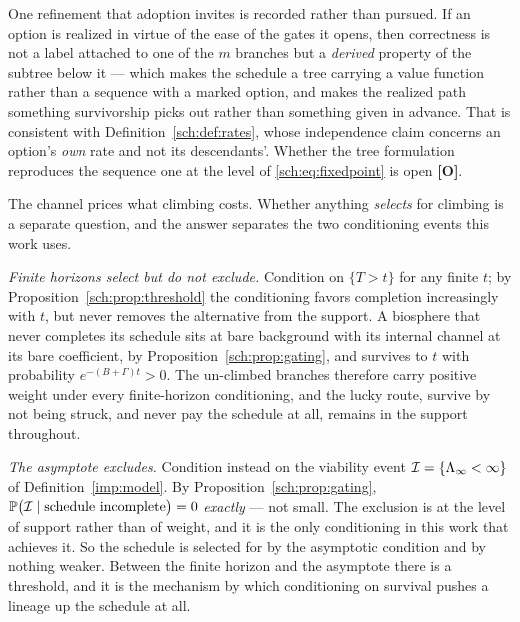 One refinement that adoption invites is recorded rather than pursued. If
an option is realized in virtue of the ease of the gates it opens, then
correctness is not a label attached to one of the $m$ branches but a
\emph{derived} property of the subtree below it --- which makes the
schedule a tree carrying a value function rather than a sequence with a
marked option, and makes the realized path something survivorship picks
out rather than something given in advance. That is consistent with
Definition~\ref{sch:def:rates}, whose independence claim concerns an
option's \emph{own} rate and not its descendants'. Whether the tree
formulation reproduces the sequence one at the level of
\eqref{sch:eq:fixedpoint} is open \textbf{[O]}.

\begin{remark}
\label{sch:rem:asymptote}
The channel prices what climbing costs. Whether anything \emph{selects}
for climbing is a separate question, and the answer separates the two
conditioning events this work uses.

\emph{Finite horizons select but do not exclude.} Condition on
$\{T>t\}$ for any finite $t$; by Proposition~\ref{sch:prop:threshold}
the conditioning favors completion increasingly with $t$, but never
removes the alternative from the support. A biosphere that never completes its schedule sits at bare
background with its internal channel at its bare coefficient, by
Proposition~\ref{sch:prop:gating}, and survives to $t$ with probability
$e^{-(B+\Gamma)t}>0$. The un-climbed branches therefore carry
positive weight under every finite-horizon conditioning, and the lucky
route, survive by not being struck, and never pay the schedule at all, remains in the support throughout.

\emph{The asymptote excludes.} Condition instead on the viability event
$\mathcal{I}=\{\Lambda_\infty<\infty\}$ of Definition~\ref{imp:model}. By
Proposition~\ref{sch:prop:gating},
$\mathbb{P}\bigl(\mathcal{I}\mid\text{schedule incomplete}\bigr)=0$ \emph{exactly} ---
not small. The exclusion is at the level of support rather than of
weight, and it is the only conditioning in this work that achieves it. So the schedule is selected for by the asymptotic condition and by
nothing weaker. Between the finite horizon and the asymptote there is a
threshold, and it is the mechanism by which conditioning on survival
pushes a lineage up the schedule at all.


\end{remark}
